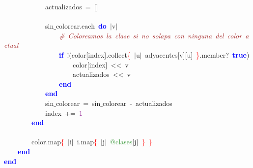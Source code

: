 \mbox{}\ \ \ \ \ \ \ \ \ \ \ \ actualizados\ \textcolor{BrickRed}{=}\ \textcolor{BrickRed}{[]} \\
\mbox{}\ \ \ \ \ \ \ \ \ \ \ \  \\
\mbox{}\ \ \ \ \ \ \ \ \ \ \ \ sin$\_$colorear\textcolor{BrickRed}{.}each\ \textbf{\textcolor{Blue}{do}}\ \textcolor{BrickRed}{$|$}v\textcolor{BrickRed}{$|$} \\
\mbox{}\ \ \ \ \ \ \ \ \ \ \ \ \ \ \ \ \textit{\textcolor{Brown}{\#\ Coloreamos\ la\ clase\ si\ no\ solapa\ con\ ninguna\ del\ color\ actual}} \\
\mbox{}\ \ \ \ \ \ \ \ \ \ \ \ \ \ \ \ \textbf{\textcolor{Blue}{if}}\ \textcolor{BrickRed}{!(}color\textcolor{BrickRed}{[}index\textcolor{BrickRed}{].}collect\textcolor{Red}{\{}\ \textcolor{BrickRed}{$|$}u\textcolor{BrickRed}{$|$}\ adyacentes\textcolor{BrickRed}{[}v\textcolor{BrickRed}{][}u\textcolor{BrickRed}{]}\ \textcolor{Red}{\}}\textcolor{BrickRed}{.}member?\ \textbf{\textcolor{Blue}{true}}\textcolor{BrickRed}{)} \\
\mbox{}\ \ \ \ \ \ \ \ \ \ \ \ \ \ \ \ \ \ \ \ color\textcolor{BrickRed}{[}index\textcolor{BrickRed}{]}\ \textcolor{BrickRed}{\textless{}\textless{}}\ v \\
\mbox{}\ \ \ \ \ \ \ \ \ \ \ \ \ \ \ \ \ \ \ \ actualizados\ \textcolor{BrickRed}{\textless{}\textless{}}\ v \\
\mbox{}\ \ \ \ \ \ \ \ \ \ \ \ \ \ \ \ \textbf{\textcolor{Blue}{end}} \\
\mbox{}\ \ \ \ \ \ \ \ \ \ \ \ \textbf{\textcolor{Blue}{end}} \\
\mbox{}\ \ \ \ \ \ \ \ \ \ \ \ sin$\_$colorear\ \textcolor{BrickRed}{=}\ sin$\_$colorear\ \textcolor{BrickRed}{-}\ actualizados \\
\mbox{}\ \ \ \ \ \ \ \ \ \ \ \ index\ \textcolor{BrickRed}{+=}\ \textcolor{Purple}{1} \\
\mbox{}\ \ \ \ \ \ \ \ \textbf{\textcolor{Blue}{end}} \\
\mbox{}\ \ \ \ \ \ \ \  \\
\mbox{}\ \ \ \ \ \ \ \ color\textcolor{BrickRed}{.}map\textcolor{Red}{\{}\ \textcolor{BrickRed}{$|$}i\textcolor{BrickRed}{$|$}\ i\textcolor{BrickRed}{.}map\textcolor{Red}{\{}\ \textcolor{BrickRed}{$|$}j\textcolor{BrickRed}{$|$}\ \textcolor{ForestGreen}{@clases}\textcolor{BrickRed}{[}j\textcolor{BrickRed}{]}\ \textcolor{Red}{\}}\ \textcolor{Red}{\}}\ \ \ \ \ \ \  \\
\mbox{}\ \ \ \ \textbf{\textcolor{Blue}{end}} \\
\mbox{}\textbf{\textcolor{Blue}{end}} \\
\mbox{}
